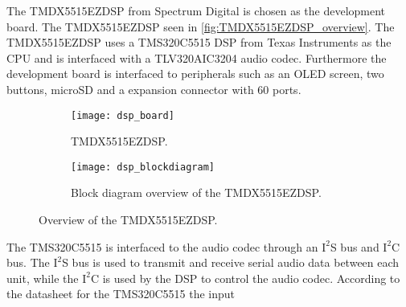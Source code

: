 The TMDX5515EZDSP from Spectrum Digital is chosen as the development board. The TMDX5515EZDSP seen in \autoref{fig:TMDX5515EZDSP_overview}. The TMDX5515EZDSP uses a TMS320C5515 DSP from Texas Instruments as the CPU and is interfaced with a TLV320AIC3204 audio codec. Furthermore the development board is interfaced to peripherals such as an OLED screen, two buttons, microSD and a expansion connector with 60 ports. 

\begin{figure}[H]
\centering
\begin{subfigure}[t]{0.47\textwidth}
\texttt{[image: dsp\_board]}
	\caption{TMDX5515EZDSP.}
	\label{fig:TMDX5515EZDSP}
\end{subfigure}
\hspace{6mm} 
\begin{subfigure}[t]{0.35\textwidth}
\texttt{[image: dsp\_blockdiagram]}
	\caption{Block diagram overview of the TMDX5515EZDSP.}
	\label{fig:TMDX5515EZDSP_blockdiagram}
\end{subfigure}
\caption{Overview of the TMDX5515EZDSP.}
\label{fig:TMDX5515EZDSP_overview}
\end{figure}

The TMS320C5515 is interfaced to the audio codec through an $\text{I}^2$S bus and $\text{I}^2$C bus. The $\text{I}^2$S bus is used to transmit and receive serial audio data between each unit, while the $\text{I}^2$C is used by the DSP to control the audio codec. According to the datasheet for the TMS320C5515 the input














